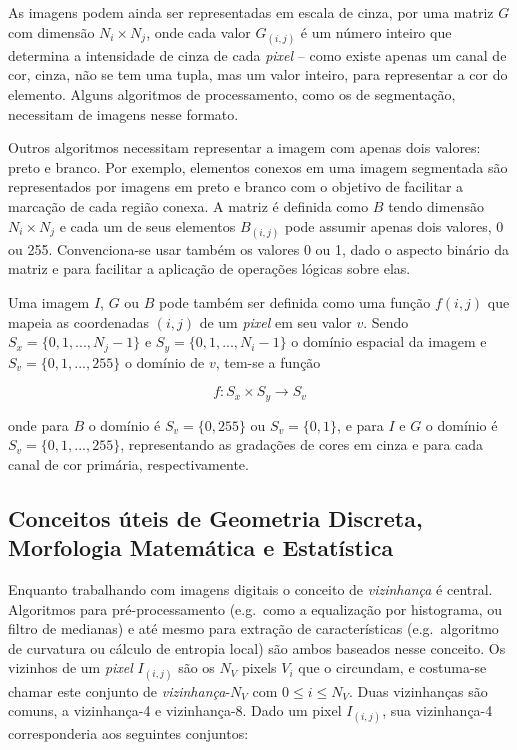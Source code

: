 As imagens podem ainda ser representadas em escala de cinza, por uma matriz
$G$ com dimensão $N_i \times N_j$, onde cada valor $G_{(i,j)}$ é um número inteiro
que determina a intensidade de cinza de cada \textit{pixel} -- como existe
apenas um canal de cor, cinza, não se tem uma tupla, mas um valor inteiro, para
representar a cor do elemento. Alguns algoritmos de processamento, como os de
segmentação, necessitam de imagens nesse formato.

Outros algoritmos necessitam representar a imagem com apenas dois valores: preto
e branco. Por exemplo, elementos conexos em uma imagem segmentada são
representados por imagens em preto e branco com o objetivo de facilitar a
marcação de cada região conexa. A matriz é definida como $B$ tendo dimensão $N_i
\times N_j$ e cada um de seus elementos $B_{(i,j)}$ pode assumir apenas dois
valores, 0 ou 255. Convenciona-se usar também os valores 0 ou 1, dado o aspecto
binário da matriz e para facilitar a aplicação de operações lógicas sobre elas.

Uma imagem $I$, $G$ ou $B$ pode também ser definida como uma função $f(i,j)$ que
mapeia as coordenadas $(i,j)$ de um \textit{pixel} em seu valor $v$. Sendo $S_x
= \{0, 1, ..., N_j - 1\}$ e $S_y = \{0, 1, ..., N_i - 1\}$ o domínio espacial da
imagem e $S_v = \{0, 1, ..., 255\}$ o domínio de $v$, tem-se a função

\begin{equation}
  f : S_x \times S_y \to S_v
\end{equation}

\noindent onde para $B$ o domínio é $S_v = \{0, 255\}$ ou $S_v = \{0, 1\}$, e para
$I$ e $G$ o domínio é $S_v = \{0, 1, ..., 255\}$, representando as gradações de
cores em cinza e para cada canal de cor primária, respectivamente.

\subsection{Conceitos úteis de Geometria Discreta, Morfologia Matemática e Estatística}

Enquanto trabalhando com imagens digitais o conceito de \emph{vizinhança} é
central.~\cite{luciano} Algoritmos para pré-processamento (e.g.\ como a
equalização por histograma, ou filtro de medianas) e até mesmo para extração de
características (e.g.\ algoritmo de curvatura ou cálculo de entropia local) são
ambos baseados nesse conceito. Os vizinhos de um \textit{pixel} $I_{(i,j)}$ são
os $N_V$ pixels $V_i$ que o circundam, e costuma-se chamar este conjunto de
\emph{vizinhança}-$N_V$ com $0 \leq i \leq N_V$. Duas vizinhanças são comuns, a
vizinhança-4 e vizinhança-8. Dado um pixel $I_{(i,j)}$, sua vizinhança-4
corresponderia aos seguintes conjuntos:

